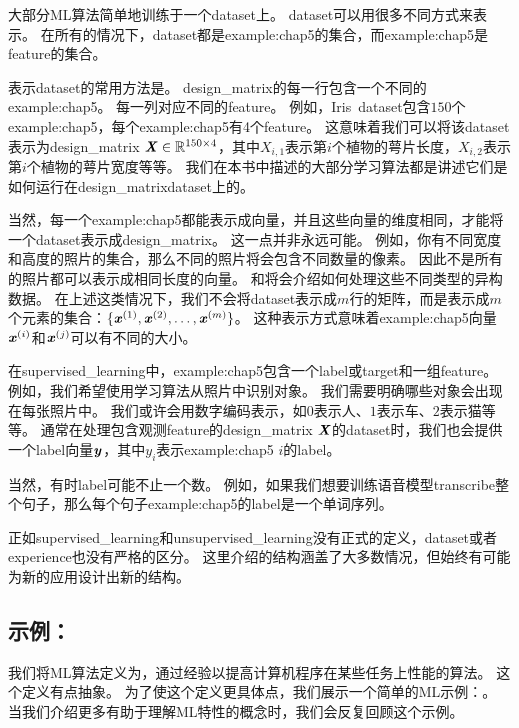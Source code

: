 大部分\gls{ML}算法简单地训练于一个\gls{dataset}上。
\gls{dataset}可以用很多不同方式来表示。
在所有的情况下，\gls{dataset}都是\gls{example:chap5}的集合，而\gls{example:chap5}是\gls{feature}的集合。

表示\gls{dataset}的常用方法是。
\gls{design_matrix}的每一行包含一个不同的\gls{example:chap5}。
每一列对应不同的\gls{feature}。
例如，Iris~\gls{dataset}包含$150$个\gls{example:chap5}，每个\gls{example:chap5}有4个\gls{feature}。
这意味着我们可以将该\gls{dataset}表示为\gls{design_matrix} $\boldsymbol{\mathit{X}}\in\mathbb{R}^{150\times 4}$，其中$X_{i,1}$表示第$i$个植物的萼片长度，$X_{i,2}$表示第$i$个植物的萼片宽度等等。
我们在本书中描述的大部分学习算法都是讲述它们是如何运行在\gls{design_matrix}\gls{dataset}上的。

当然，每一个\gls{example:chap5}都能表示成向量，并且这些向量的维度相同，才能将一个\gls{dataset}表示成\gls{design_matrix}。
这一点并非永远可能。
例如，你有不同宽度和高度的照片的集合，那么不同的照片将会包含不同数量的像素。
因此不是所有的照片都可以表示成相同长度的向量。
和将会介绍如何处理这些不同类型的异构数据。
在上述这类情况下，我们不会将\gls{dataset}表示成$m$行的矩阵，而是表示成$m$个元素的集合：$\{\boldsymbol{\mathit{x}}^{(1)},\boldsymbol{\mathit{x}}^{(2)},\dots,\boldsymbol{\mathit{x}}^{(m)}\}$。
这种表示方式意味着\gls{example:chap5}向量$\boldsymbol{\mathit{x}}^{(i)}$和$\boldsymbol{\mathit{x}}^{(j)}$可以有不同的大小。


在\gls{supervised_learning}中，\gls{example:chap5}包含一个\gls{label}或\gls{target}和一组\gls{feature}。
例如，我们希望使用学习算法从照片中识别对象。
我们需要明确哪些对象会出现在每张照片中。
我们或许会用数字编码表示，如$0$表示人、$1$表示车、$2$表示猫等等。
通常在处理包含观测\gls{feature}的\gls{design_matrix} $\boldsymbol{\mathit{X}}$的\gls{dataset}时，我们也会提供一个\gls{label}向量$\boldsymbol{\mathit{y}}$，其中$y_i$表示\gls{example:chap5} $i$的\gls{label}。


当然，有时\gls{label}可能不止一个数。
例如，如果我们想要训练语音模型\gls{transcribe}整个句子，那么每个句子\gls{example:chap5}的\gls{label}是一个单词序列。


正如\gls{supervised_learning}和\gls{unsupervised_learning}没有正式的定义，\gls{dataset}或者\gls{experience}也没有严格的区分。
这里介绍的结构涵盖了大多数情况，但始终有可能为新的应用设计出新的结构。

\subsection{示例：}
\label{sec:example_linear_regression}
我们将\gls{ML}算法定义为，通过经验以提高计算机程序在某些任务上性能的算法。
这个定义有点抽象。
为了使这个定义更具体点，我们展示一个简单的\gls{ML}示例：。
当我们介绍更多有助于理解\gls{ML}特性的概念时，我们会反复回顾这个示例。

